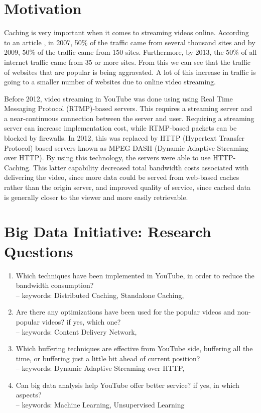 \documentclass[a4paper,10pt]{article}
\begin{document}
\section{Motivation}

Caching is very important when it comes to streaming videos online. According to an article \cite{OnlineVideoBandwagon}, in 2007, 50\% of the traffic came from several thousand sites and by 2009, 50\% of the traffic came from 150 sites. Furthermore, by 2013, the 50\% of all internet traffic came from 35 or more sites. From this we can see that the traffic of websites that are popular is being aggravated. A lot of this increase in traffic is going to a smaller number of websites due to online video streaming.

Before 2012, video streaming in YouTube was done using using Real Time Messaging Protocol (RTMP)-based servers. This requires a streaming server and a near-continuous connection between the server and user. Requiring a streaming server can increase implementation cost, while RTMP-based packets can be blocked by firewalls. In 2012, this was replaced by HTTP (Hypertext Transfer Protocol) based servers known as MPEG DASH \cite{MPEGDASH}(Dynamic Adaptive Streaming over HTTP). By using this technology, the servers were able to use HTTP-Caching. This latter capability decreased total bandwidth costs associated with delivering the video, since more data could be served from web-based caches rather than the origin server, and improved quality of service, since cached data is generally closer to the viewer and more easily retrievable.

\section{Big Data Initiative: Research Questions}
\begin{enumerate}
\item Which techniques have been implemented in YouTube, in order to reduce the bandwidth consumption?\\
-- keywords: Distributed Caching, Standalone Caching,
\item Are there any optimizations have been used for the popular videos and non-popular videos? if yes, which one?\\
-- keywords: Content Delivery Network,
\item Which buffering techniques are effective from YouTube side, buffering all the time, or buffering just a little bit ahead of current position?\\
-- keywords: Dynamic Adaptive Streaming over HTTP,
\item Can big data analysis help YouTube offer better service? if yes, in which aspects?\\
-- keywords: Machine Learning, Unsupervised Learning
\end{enumerate}
\end{document}
